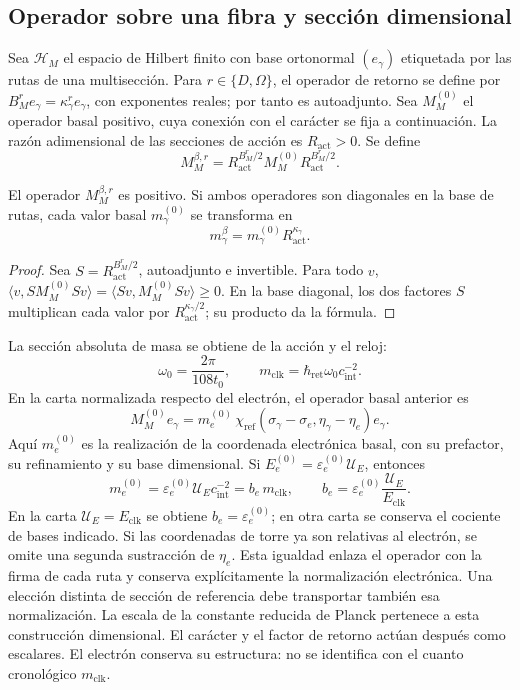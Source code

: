 \subsection{Operador sobre una fibra y sección dimensional}

Sea \(\mathscr H_M\) el espacio de Hilbert finito con base ortonormal
\((e_\gamma)\) etiquetada por las rutas de una multisección. Para
\(r\in\{D,\Omega\}\), el operador de retorno se define por
\(B_M^re_\gamma=\kappa_\gamma^re_\gamma\), con exponentes reales;
por tanto es autoadjunto. Sea \(M_M^{(0)}\) el operador basal positivo,
cuya conexión con el carácter se fija a continuación.
La razón adimensional de las
secciones de acción es \(R_{\mathrm{act}}>0\). Se define
\[
 M_M^{\beta,r}=R_{\mathrm{act}}^{B_M^r/2}
 M_M^{(0)}R_{\mathrm{act}}^{B_M^r/2}.
\]

\begin{proposition}
El operador \(M_M^{\beta,r}\) es positivo. Si ambos operadores son
diagonales en la base de rutas, cada valor basal \(m_\gamma^{(0)}\)
se transforma en
\[
 m_\gamma^\beta=m_\gamma^{(0)}R_{\mathrm{act}}^{\kappa_\gamma}.
\]
\end{proposition}
\begin{proof}
Sea \(S=R_{\mathrm{act}}^{B_M^r/2}\), autoadjunto e invertible.
Para todo \(v\),
\(\langle v,SM_M^{(0)}Sv\rangle=\langle Sv,M_M^{(0)}Sv\rangle\ge0\).
En la base diagonal, los dos factores \(S\) multiplican cada valor
por \(R_{\mathrm{act}}^{\kappa_\gamma/2}\); su producto da la fórmula.
\end{proof}

La sección absoluta de masa se obtiene de la acción y el reloj:
\[
 \omega_0=\frac{2\pi}{108t_0},\qquad
m_{\mathrm{clk}}=\hbar_{\mathrm{ret}}\omega_0c_{\mathrm{int}}^{-2}.
\]
En la carta normalizada respecto del electrón, el operador basal anterior es
\[
 M_M^{(0)}e_\gamma
 =m_e^{(0)}\,
   \chi_{\mathrm{ref}}(\sigma_\gamma-\sigma_e,
                       \eta_\gamma-\eta_e)e_\gamma.
\]
Aquí \(m_e^{(0)}\) es la realización de la coordenada electrónica
basal, con su prefactor, su refinamiento y su base dimensional.
Si \(E_e^{(0)}=\varepsilon_e^{(0)}\mathcal U_E\), entonces
\[
 m_e^{(0)}=\varepsilon_e^{(0)}\mathcal U_Ec_{\mathrm{int}}^{-2}
 =b_e\,m_{\mathrm{clk}},\qquad
 b_e=\varepsilon_e^{(0)}\frac{\mathcal U_E}{E_{\mathrm{clk}}}.
\]
En la carta \(\mathcal U_E=E_{\mathrm{clk}}\) se obtiene
\(b_e=\varepsilon_e^{(0)}\); en otra carta se conserva el cociente
de bases indicado. Si las coordenadas de torre ya son
relativas al electrón, se omite una segunda sustracción de \(\eta_e\).
Esta igualdad enlaza el operador con la firma de cada ruta y conserva
explícitamente la normalización electrónica. Una elección distinta de
sección de referencia debe transportar también esa normalización.
La escala de la constante reducida de Planck pertenece a esta construcción
dimensional. El carácter y el factor de retorno actúan después como
escalares. El electrón conserva su estructura: no se identifica con el
cuanto cronológico \(m_{\mathrm{clk}}\).

